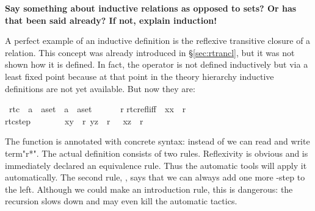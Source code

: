 %
\begin{isabellebody}%
\def\isabellecontext{Star}%
%
%
\begin{isamarkuptext}%
\label{sec:rtc}
{\bf Say something about inductive relations as opposed to sets? Or has that
been said already? If not, explain induction!}

A perfect example of an inductive definition is the reflexive transitive
closure of a relation. This concept was already introduced in
\S\ref{sec:rtrancl}, but it was not shown how it is defined. In fact,
the operator \isa{{\isacharcircum}{\isacharasterisk}} is not defined inductively but via a least
fixed point because at that point in the theory hierarchy
inductive definitions are not yet available. But now they are:%
\end{isamarkuptext}%
\ rtc\ {\isacharcolon}{\isacharcolon}\ {\isachardoublequote}{\isacharparenleft}{\isacharprime}a\ {\isasymtimes}\ {\isacharprime}a{\isacharparenright}set\ {\isasymRightarrow}\ {\isacharparenleft}{\isacharprime}a\ {\isasymtimes}\ {\isacharprime}a{\isacharparenright}set{\isachardoublequote}\ \ \ {\isacharparenleft}{\isachardoublequote}{\isacharunderscore}{\isacharasterisk}{\isachardoublequote}\ {\isacharbrackleft}{}{}{}{}{\isacharbrackright}\ {}{}{}{\isacharparenright}\isanewline
{}\ {\isachardoublequote}r{\isacharasterisk}{\isachardoublequote}\isanewline
{}\isanewline
rtc{\isacharunderscore}refl{\isacharbrackleft}iff{\isacharbrackright}{\isacharcolon}\ \ {\isachardoublequote}{\isacharparenleft}x{\isacharcomma}x{\isacharparenright}\ {\isasymin}\ r{\isacharasterisk}{\isachardoublequote}\isanewline
rtc{\isacharunderscore}step{\isacharcolon}\ \ \ \ \ \ \ {\isachardoublequote}{\isasymlbrakk}\ {\isacharparenleft}x{\isacharcomma}y{\isacharparenright}\ {\isasymin}\ r{\isacharsemicolon}\ {\isacharparenleft}y{\isacharcomma}z{\isacharparenright}\ {\isasymin}\ r{\isacharasterisk}\ {\isasymrbrakk}\ {\isasymLongrightarrow}\ {\isacharparenleft}x{\isacharcomma}z{\isacharparenright}\ {\isasymin}\ r{\isacharasterisk}{\isachardoublequote}%
\begin{isamarkuptext}%
\noindent
The function  is annotated with concrete syntax: instead of
 we can read and write {term"r*"}. The actual definition
consists of two rules. Reflexivity is obvious and is immediately declared an
equivalence rule.  Thus the automatic tools will apply it automatically. The
second rule, , says that we can always add one more
-step to the left. Although we could make  an
introduction rule, this is dangerous: the recursion slows down and may
even kill the automatic tactics.


\end{isamarkuptext}
\end{isabellebody}
